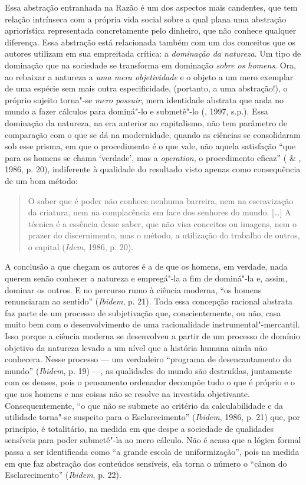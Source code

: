 Essa abstração entranhada na Razão é um dos aspectos mais candentes, que
tem relação intrínseca com a própria vida social sobre a qual plana uma
abstração apriorística representada concretamente pelo dinheiro, que não
conhece qualquer diferença. Essa abstração está relacionada também com
um dos conceitos que os autores utilizam em sua empreitada crítica: a
\emph{dominação da natureza}. Um tipo de dominação que na sociedade se
transforma em dominação \emph{sobre os homens}. Ora, ao rebaixar a
natureza a \emph{uma mera objetividade} e o objeto a um mero exemplar de
uma espécie sem mais outra especificidade, (portanto, a uma abstração!),
o próprio sujeito torna"-se \emph{mero possuir}, mera identidade abstrata
que anda no mundo a fazer cálculos para dominá"-lo e submetê"-lo (,
1997, s.p.). Essa dominação da natureza, na era anterior ao capitalismo,
não tem parâmetro de comparação com o que se dá na modernidade, quando
as ciências se consolidaram sob esse prisma, em que o procedimento é o
que vale, não aquela satisfação ``que para os homens se chama `verdade',
mas a \emph{operation}, o procedimento eficaz'' ( \& ,
1986, p. 20), indiferente à qualidade do resultado visto apenas como
consequência de um bom método:

\begin{quote}
O saber que é poder não conhece nenhuma barreira, nem na escravização da
criatura, nem na complacência em face dos senhores do mundo. [\ldots{}] A
técnica é a essência desse saber, que não visa conceitos ou imagens, nem
o prazer do discernimento, mas o método, a utilização do trabalho de
outros, o capital (\emph{Idem}, 1986, p. 20).
\end{quote}

A conclusão a que chegam os autores é a de que os homens, em verdade,
nada querem senão conhecer a natureza e empregá"-la a fim de dominá"-la e,
assim, dominar os outros. E no percurso rumo à ciência moderna, ``os
homens renunciaram ao sentido'' (\emph{Ibidem}, p. 21). Toda essa
concepção racional abstrata faz parte de um processo de subjetivação
que, conscientemente, ou não, casa muito bem com o desenvolvimento de
uma racionalidade instrumental"-mercantil. Isso porque a ciência moderna
se desenvolveu a partir de um processo de domínio objetivo da natureza
levado a um nível que a história humana ainda não conhecera. Nesse
processo --- um verdadeiro ``programa de desencantamento do mundo''
(\emph{Ibidem}, p. 19) ---, as qualidades do mundo são destruídas,
juntamente com os deuses, pois o pensamento ordenador decompõe tudo o
que é próprio e o que nos homens e nas coisas não se resolve na
investida objetivante. Consequentemente, ``o que não se submete ao
critério da calculabilidade e da utilidade torna"-se suspeito para o
Esclarecimento'' (\emph{Ibidem}, 1986, p. 21) que, por princípio, é
totalitário, na medida em que despe a sociedade de qualidades sensíveis
para poder submetê"-la ao mero cálculo. Não é acaso que a lógica formal
passa a ser identificada como ``a grande escola de uniformização'', pois
na medida em que faz abstração dos conteúdos sensíveis, ela torna o
número o ``cânon do Esclarecimento'' (\emph{Ibidem}, p. 22).

